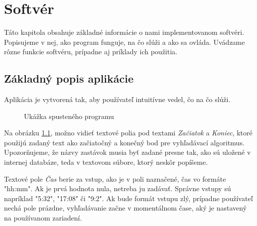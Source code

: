 \chapter{Softvér}
\label{kap:softver}

Táto kapitola obsahuje základné informácie o nami implementovanom softvéri. Popisujeme v nej, ako program funguje, na čo slúži a ako sa ovláda. Uvádzame rôzne funkcie softvéru, prípadne aj príklady ich použitia.


\section{Základný popis aplikácie}

Aplikácia je vytvorená tak, aby používateľ intuitívne vedel, čo na čo slúži.\newline

\begin{figure}[H]
  \caption{Ukážka spusteného programu}
  \label{ukazka_programu1}
\end{figure}

Na obrázku \ref{ukazka_programu1}, možno vidieť textové polia pod textami \textit{Začiatok} a \textit{Koniec}, ktoré použijú zadaný text ako začiatočný a konečný bod pre vyhľadávací algoritmus. Upozorňujeme, že názvy zastávok musia byť zadané presne tak, ako sú uložené v internej databáze, teda v textovom súbore, ktorý neskôr popíšeme.\newline

Textové pole \textit{Čas} berie za vstup, ako je v poli naznačené, čas vo formáte "hh:mm". Ak je prvá hodnota nula, netreba ju zadávať. Správne vstupy sú napríklad "5:32", "17:08"  či "9:2". Ak bude formát vstupu zlý, prípadne používateľ nechá pole prázdne, vyhľadávanie začne v momentálnom čase, aký je nastavený na používanom zariadení.\newline

